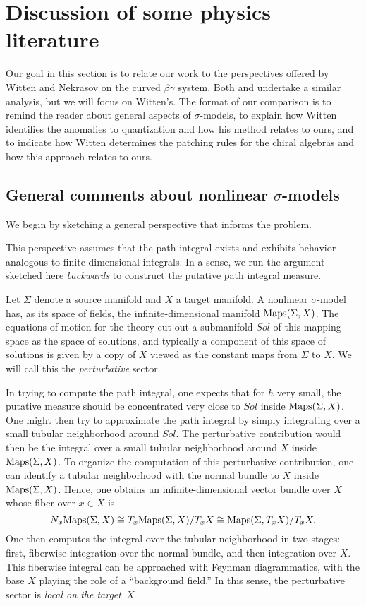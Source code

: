 \section{Discussion of some physics literature}

Our goal in this section is to relate our work to the perspectives offered by Witten and Nekrasov on the curved $\beta\gamma$ system.
Both \cite{WittenCDO} and \cite{Nek} undertake a similar analysis, but we will focus on Witten's.
The format of our comparison is to remind the reader about general aspects of $\sigma$-models,
to explain how Witten identifies the anomalies to quantization and how his method relates to ours,
and to indicate how Witten determines the patching rules for the chiral algebras and how this approach relates to ours.

\subsection{General comments about nonlinear $\sigma$-models}

\def\Maps{{\rm Maps}}

We begin by sketching a general perspective that informs the problem.

\begin{rmk}
This perspective assumes that the path integral exists and exhibits behavior analogous to finite-dimensional integrals.
In a sense, we run the argument sketched here {\it backwards} to construct the putative path integral measure.
\end{rmk}

Let $\Sigma$ denote a source manifold and $X$ a target manifold.
A nonlinear $\sigma$-model has, as its space of fields, the infinite-dimensional manifold $\Maps(\Sigma,X)$.
The equations of motion for the theory cut out a submanifold $Sol$ of this mapping space as the space of solutions,
and typically a component of this space of solutions is given by a copy of $X$ viewed as the constant maps from $\Sigma$ to $X$.
We will call this the {\em perturbative} sector.

In trying to compute the path integral, one expects that for $\hbar$ very small, 
the putative measure should be concentrated very close to $Sol$ inside $\Maps(\Sigma,X)$.
One might then try to approximate the path integral by simply integrating over a small tubular neighborhood around $Sol$.
The perturbative contribution would then be the integral over a small tubular neighborhood around $X$ inside $\Maps(\Sigma,X)$.
To organize the computation of this perturbative contribution, one can identify a tubular neighborhood with the normal bundle to $X$ inside $\Maps(\Sigma,X)$.
Hence, one obtains an infinite-dimensional vector bundle over $X$ whose fiber over $x \in X$ is 
\[
N_x \Maps(\Sigma,X) \cong T_x \Maps(\Sigma,X)/T_x X \cong \Maps(\Sigma, T_x X)/T_x X.
\]
One then computes the integral over the tubular neighborhood in two stages: 
first, fiberwise integration over the normal bundle, and then integration over $X$.
This fiberwise integral can be approached with Feynman diagrammatics,
with the base $X$ playing the role of a ``background field.''
In this sense, the perturbative sector is {\em local on the target~$X$}


